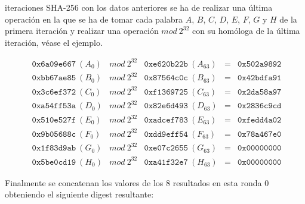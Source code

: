 \documentclass{article}
\begin{document}
        \vspace{1.3mm}
        
         iteraciones SHA-256 con los datos anteriores se ha de realizar una última operación en la que se ha de tomar cada palabra $A$, $B$, $C$, $D$, $E$, $F$, $G$ y $H$ de la primera iteración y realizar  una operación $mod\ 2^{32}$ con su homóloga de la última iteración, véase el ejemplo.
        
        \begin{figure}[H]
        \centering
            $\begin{array}{lllll}
                \texttt{0x6a09e667}\ (A_{0}) & mod\ 2^{32} & \texttt{0xe620b22b}\ (A_{63}) & = & \texttt{0x502a9892} \\
                \texttt{0xbb67ae85}\ (B_{0}) & mod\ 2^{32} & \texttt{0x87564c0c}\ (B_{63}) & = & \texttt{0x42bdfa91} \\
                \texttt{0x3c6ef372}\ (C_{0}) & mod\ 2^{32} & \texttt{0xf1369725}\ (C_{63}) & = & \texttt{0x2da58a97} \\
                \texttt{0xa54ff53a}\ (D_{0}) & mod\ 2^{32} & \texttt{0x82e6d493}\ (D_{63}) & = & \texttt{0x2836c9cd} \\
                \texttt{0x510e527f}\ (E_{0}) & mod\ 2^{32} & \texttt{0xadcef783}\ (E_{63}) & = & \texttt{0xfedd4a02} \\
                \texttt{0x9b05688c}\ (F_{0}) & mod\ 2^{32} & \texttt{0xdd9eff54}\ (F_{63}) & = & \texttt{0x78a467e0} \\
                \texttt{0x1f83d9ab}\ (G_{0}) & mod\ 2^{32} & \texttt{0xe07c2655}\ (G_{63}) & = & \texttt{0x00000000} \\
                \texttt{0x5be0cd19}\ (H_{0}) & mod\ 2^{32} & \texttt{0xa41f32e7}\ (H_{63}) & = & \texttt{0x00000000}
            \end{array}$
        \end{figure}
        
        Finalmente se concatenan los valores de los 8 resultados en esta ronda 0 obteniendo el siguiente digest resultante:
        
\end{document}
